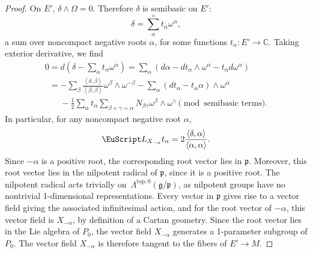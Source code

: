 \documentclass[pdftex]{sigma}
\newcommand{\LieDer}{\ensuremath{\EuScript L}}
\begin{document}
\begin{proof}
On $E'$, $\delta \wedge \Omega = 0$.
Therefore $\delta$ is semibasic on $E'$:
\[
\delta = \sum^{\times}_{\alpha} t_{\alpha} \omega^{\alpha},
\]
a sum over noncompact negative roots $\alpha$, for some
functions $t_{\alpha} : E' \to \mathbb{C}.$
Taking exterior derivative, we f\/ind
\begin{gather*}
0 =
d \left(\delta - \sum _{\alpha} t_{\alpha} \omega^{\alpha} \right)
 = \sum_{\alpha}
\left(
d \alpha
-
dt_{\alpha} \wedge \omega^{\alpha}
- t_{\alpha} d \omega^{\alpha}
\right)
\\
\phantom{0}{} =
-
\sum_{\beta} \frac{\left<\delta,\beta\right>}
{\left<\beta,\beta\right>} \omega^{\beta} \wedge \omega^{-\beta}
-
\sum_{\alpha}
\left(dt_{\alpha} - t_{\alpha} \alpha\right) \wedge \omega^{\alpha}
\\
\phantom{0=}{} - \frac{1}{2}
\sum_{\alpha} t_{\alpha}
\sum_{\beta + \gamma=\alpha} N_{\beta \gamma} \omega^{\beta} \wedge \omega^{\gamma}
\pmod{\text{semibasic terms}}.
\end{gather*}
In particular, for any noncompact negative root $\alpha$,
\[
\LieDer_{X_{-\alpha}} t_{\alpha} = 2 \frac{\left<\delta,\alpha\right>}{\left<\alpha,\alpha\right>}.
\]
Since $-\alpha$ is a positive root, the corresponding root vector
lies in $\mathfrak{p}$. Moreover, this root vector lies in the
nilpotent radical of $\mathfrak{p}$, since it is a positive root.
The nilpotent radical acts trivially on~$\Lambda^{\text{top},0}\left(\mathfrak{g}/\mathfrak{p}\right)$,
as nilpotent groups have no nontrivial 1-dimensional representations.
Every vector in $\mathfrak{p}$ gives rise to a vector f\/ield
giving the associated inf\/initesimal action, and for the root
vector of $-\alpha$, this vector f\/ield is $X_{-\alpha}$,
by def\/inition of a Cartan geometry. Since the root
vector lies in the Lie algebra of $P_0$, the vector f\/ield
$X_{-\alpha}$ generates a 1-parameter subgroup of $P_0$.
The vector f\/ield $X_{-\alpha}$ is therefore
tangent to the f\/ibers of $E' \to M$.


\end{proof}
\end{document}
